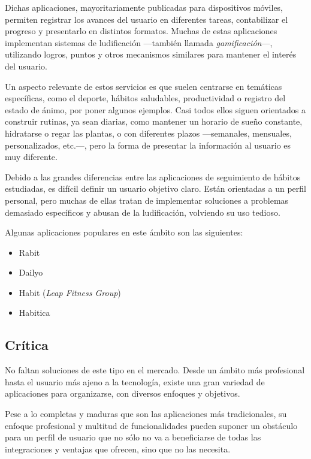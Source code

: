 \documentclass[10pt, a4paper]{aqademic}
\begin{document}
\medskip

Dichas aplicaciones, mayoritariamente publicadas para dispositivos móviles, permiten registrar los avances del usuario en diferentes tareas, contabilizar el progreso y presentarlo en distintos formatos. Muchas de estas aplicaciones implementan sistemas de ludificación \cite{inproceedings} ---también llamada \textit{gamificación}---, utilizando logros, puntos y otros mecanismos similares para mantener el interés del usuario.

\medskip

Un aspecto relevante de estos servicios es que suelen centrarse en temáticas específicas, como el deporte, hábitos saludables, productividad o registro del estado de ánimo, por poner algunos ejemplos. Casi todos ellos siguen orientados a construir rutinas, ya sean diarias, como mantener un horario de sueño constante, hidratarse o regar las plantas, o con diferentes plazos ---semanales, mensuales, personalizados, etc.---, pero la forma de presentar la información al usuario es muy diferente. 

\medskip

Debido a las grandes diferencias entre las aplicaciones de seguimiento de hábitos estudiadas, es difícil definir un usuario objetivo claro. Están orientadas a un perfil personal, pero muchas de ellas tratan de implementar soluciones a problemas demasiado específicos y abusan de la ludificación, volviendo su uso tedioso.

\medskip

Algunas aplicaciones populares en este ámbito son las siguientes:

\begin{itemize}
	\item Rabit
	\item Dailyo
	\item Habit (\textit{Leap Fitness Group})
	\item Habitica
\end{itemize}


\subsection*{Crítica}

No faltan soluciones de este tipo en el mercado. Desde un ámbito más profesional hasta el usuario más ajeno a la tecnología, existe una gran variedad de aplicaciones para organizarse, con diversos enfoques y objetivos. 

Pese a lo completas y maduras que son las aplicaciones más tradicionales, su enfoque profesional y multitud de funcionalidades pueden suponer un obstáculo para un perfil de usuario que no sólo no va a beneficiarse de todas las integraciones y ventajas que ofrecen, sino que no las necesita. 
\end{document}
